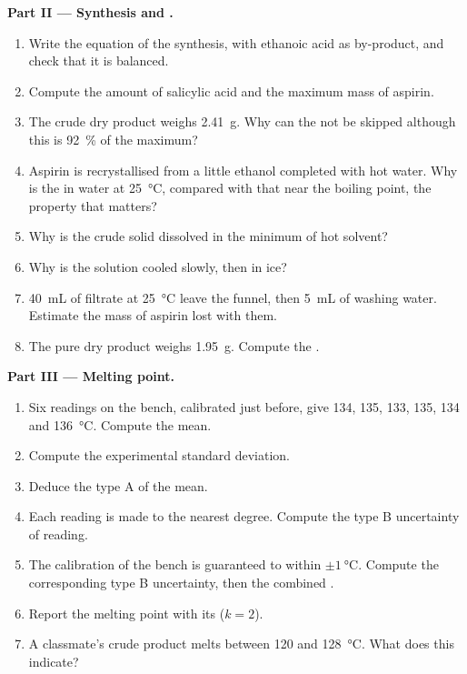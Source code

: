 \begin{problem}
\noindent\textbf{Part II --- Synthesis and .}
\begin{enumerate}[resume]
  \item Write the equation of the synthesis, with ethanoic acid
         as by-product, and check that it is balanced.
  \item Compute the amount of salicylic acid and the maximum mass of
        aspirin.
  \item The crude dry product weighs \qty{2.41}{g}. Why can the
         not be skipped although this is
        \qty{92}{\percent} of the maximum?
  \item Aspirin is recrystallised from a little ethanol completed with hot
        water. Why is the  in water at \qty{25}{\celsius}, compared
        with that near the boiling point, the property that matters?
  \item Why is the crude solid dissolved in the minimum of hot solvent?
  \item Why is the solution cooled slowly, then in ice?
  \item \qty{40}{mL} of filtrate at \qty{25}{\celsius} leave the funnel,
        then \qty{5}{mL} of washing water. Estimate the mass of aspirin
        lost with them.
  \item The pure dry product weighs \qty{1.95}{g}. Compute the .
\end{enumerate}

\noindent\textbf{Part III --- Melting point.}
\begin{enumerate}[resume]
  \item Six readings on the bench, calibrated just before, give 134, 135,
        133, 135, 134 and \qty{136}{\celsius}. Compute the mean.
  \item Compute the experimental standard deviation.
  \item Deduce the type A  of the mean.
  \item Each reading is made to the nearest degree. Compute the type B
        uncertainty of reading.
  \item The calibration of the bench is guaranteed to within
        $\pm\qty{1}{\celsius}$. Compute the corresponding type B
        uncertainty, then the combined .
  \item Report the melting point with its  ($k = 2$).
  \item A classmate's crude product melts between 120 and
        \qty{128}{\celsius}. What does this indicate?
\end{enumerate}


\end{problem}
